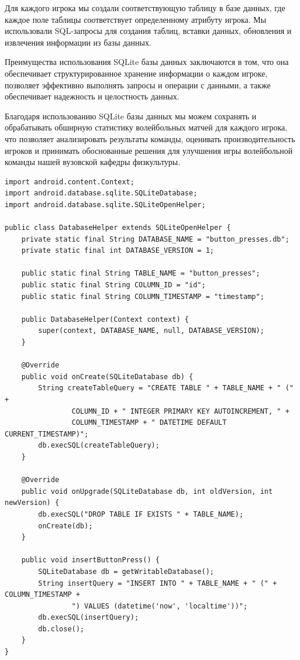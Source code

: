 \documentclass[12pt]{article}
\begin{document}
    Для каждого игрока мы создали соответствующую таблицу в базе данных, где каждое поле таблицы соответствует определенному атрибуту игрока. Мы использовали SQL-запросы для создания таблиц, вставки данных, обновления и извлечения информации из базы данных.

    Преимущества использования SQLite базы данных заключаются в том, что она обеспечивает структурированное хранение информации о каждом игроке, позволяет эффективно выполнять запросы и операции с данными, а также обеспечивает надежность и целостность данных.

    Благодаря использованию SQLite базы данных мы можем сохранять и обрабатывать обширную статистику волейбольных матчей для каждого игрока, что позволяет анализировать результаты команды, оценивать производительность игроков и принимать обоснованные решения для улучшения игры волейбольной команды нашей вузовской кафедры физкультуры.


    \begin{verbatim}
import android.content.Context;
import android.database.sqlite.SQLiteDatabase;
import android.database.sqlite.SQLiteOpenHelper;

public class DatabaseHelper extends SQLiteOpenHelper {
    private static final String DATABASE_NAME = "button_presses.db";
    private static final int DATABASE_VERSION = 1;

    public static final String TABLE_NAME = "button_presses";
    public static final String COLUMN_ID = "id";
    public static final String COLUMN_TIMESTAMP = "timestamp";

    public DatabaseHelper(Context context) {
        super(context, DATABASE_NAME, null, DATABASE_VERSION);
    }

    @Override
    public void onCreate(SQLiteDatabase db) {
        String createTableQuery = "CREATE TABLE " + TABLE_NAME + " (" +
                COLUMN_ID + " INTEGER PRIMARY KEY AUTOINCREMENT, " +
                COLUMN_TIMESTAMP + " DATETIME DEFAULT CURRENT_TIMESTAMP)";
        db.execSQL(createTableQuery);
    }

    @Override
    public void onUpgrade(SQLiteDatabase db, int oldVersion, int newVersion) {
        db.execSQL("DROP TABLE IF EXISTS " + TABLE_NAME);
        onCreate(db);
    }

    public void insertButtonPress() {
        SQLiteDatabase db = getWritableDatabase();
        String insertQuery = "INSERT INTO " + TABLE_NAME + " (" + COLUMN_TIMESTAMP +
                ") VALUES (datetime('now', 'localtime'))";
        db.execSQL(insertQuery);
        db.close();
    }
}

    \end{verbatim}
\end{document}

